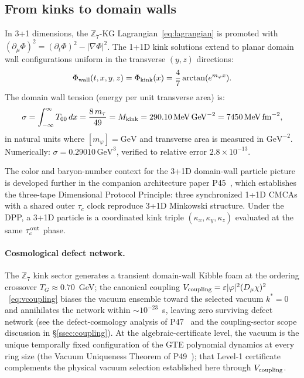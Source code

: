 \documentclass[11pt]{article}
\theoremstyle{remark}
\newcommand{\ZS}{\mathbb{Z}_7}
\newcommand{\Mkink}{M_{\rm kink}}
\newcommand{\mtau}{m_\tau}
\begin{document}
\subsection{From kinks to domain walls}
\label{ssec:domain_walls}

In 3+1 dimensions, the $\ZS$-KG Lagrangian~\eqref{eq:lagrangian} is promoted
with $(\partial_\mu\Phi)^2 = (\partial_t\Phi)^2 - |\nabla\Phi|^2$.  The 1+1D
kink solutions extend to planar domain wall configurations uniform in the transverse
$(y,z)$ directions:
\begin{equation}
  \Phi_{\rm wall}(t,x,y,z) = \Phi_{\rm kink}(x) = \frac{4}{7}\arctan(e^{m_\varphi x}).
\end{equation}
The domain wall tension (energy per unit transverse area) is:
\begin{equation}
  \sigma = \int_{-\infty}^{\infty} T_{00}\,dx
  = \frac{8\,\mtau}{49} = \Mkink = 290.10\,\mathrm{MeV\,GeV}^{-2}
  = 7450\,\mathrm{MeV\,fm}^{-2},
  \label{eq:tension}
\end{equation}
in natural units where $[m_\varphi] = \mathrm{GeV}$ and transverse area is
measured in $\mathrm{GeV}^{-2}$.  Numerically:
$\sigma = 0.29010\,\mathrm{GeV}^3$, verified to relative error $2.8\times10^{-13}$.

The color and baryon-number context for the 3+1D domain-wall particle picture
is developed further in the companion architecture paper P45~\cite{SpivackThreeTapeCMCA},
which establishes the three-tape Dimensional Protocol Principle: three synchronized
1+1D CMCAs with a shared outer $\tau_c$ clock reproduce 3+1D Minkowski structure.
Under the DPP, a 3+1D particle is a coordinated kink triple
$(\kappa_x,\kappa_y,\kappa_z)$ evaluated at the same $\tau_c^{\rm out}$ phase.

\paragraph{Cosmological defect network.}
The $\ZS$ kink sector generates a transient domain-wall Kibble foam at the
ordering crossover $T_G \approx 0.70$~GeV; the canonical coupling
$V_{\rm coupling} = \varepsilon|\varphi|^2(D_\mu\chi)^2$~\eqref{eq:vcoupling}
biases the vacuum ensemble toward the selected vacuum $k^\ast = 0$ and
annihilates the network within $\sim10^{-23}$~s, leaving zero surviving
defect network (see the defect-cosmology analysis of
P47~\cite{SpivackGTECosmology} and the coupling-sector scope discussion in
\S\ref{ssec:coupling}).  At the algebraic-certificate level, the vacuum is
the unique temporally fixed configuration of the GTE polynomial dynamics at
every ring size (the Vacuum Uniqueness Theorem of
P49~\cite{SpivackGTEPolynomialWolfram}); that Level-1 certificate complements
the physical vacuum selection established here through $V_{\rm coupling}$.
\end{document}

